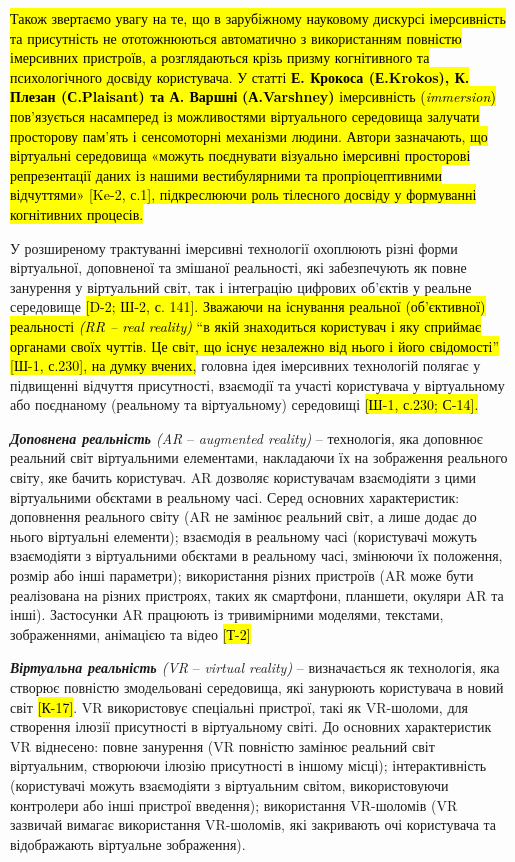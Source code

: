 \hl{Також звертаємо увагу на те, що в зарубіжному науковому дискурсі імерсивність та присутність не ототожнюються автоматично з використанням повністю імерсивних пристроїв, а розглядаються крізь призму когнітивного та психологічного досвіду користувача. У статті \textbf{Е. Крокоса (Е.Krokos), К. Плезан (С.Plaisant) та А. Варшні} \textbf{(А.Varshney)} імерсивність (\emph{immersion}) пов'язується насамперед із можливостями віртуального середовища залучати просторову пам'ять і сенсомоторні механізми людини. Автори зазначають, що віртуальні середовища «можуть поєднувати візуально імерсивні просторові репрезентації даних із нашими вестибулярними та пропріоцептивними відчуттями» {[}Ke-2, с.1{]}, підкреслюючи роль тілесного досвіду у формуванні когнітивних процесів.}

У розширеному трактуванні імерсивні технології охоплюють різні форми віртуальної, доповненої та змішаної реальності, які забезпечують як повне занурення у віртуальний світ, так і інтеграцію цифрових об'єктів у реальне середовище \hl{{[}D-2; Ш-2, с. 141{]}. Зважаючи на існування реальної (об'єктивної) реальності \emph{(RR -- real reality)} ``в якій знаходиться користувач і яку сприймає органами своїх чуттів. Це світ, що існує незалежно від нього і його свідомості'' {[}Ш-1, с.230{]}, на думку вчених,} головна ідея імерсивних технологій полягає у підвищенні відчуття присутності, взаємодії та участі користувача у віртуальному або поєднаному (реальному та віртуальному) середовищі \hl{{[}Ш-1, с.230; С-14{]}.}

\emph{\textbf{Доповнена реальність} (AR} -- \emph{augmented reality)} -- технологія, яка доповнює реальний світ віртуальними елементами, накладаючи їх на зображення реального світу, яке бачить користувач. AR дозволяє користувачам взаємодіяти з цими віртуальними об\textquotesingle єктами в реальному часі. Серед основних характеристик: доповнення реального світу (AR не замінює реальний світ, а лише додає до нього віртуальні елементи); взаємодія в реальному часі (користувачі можуть взаємодіяти з віртуальними об\textquotesingle єктами в реальному часі, змінюючи їх положення, розмір або інші параметри); використання різних пристроїв (AR може бути реалізована на різних пристроях, таких як смартфони, планшети, окуляри AR та інші). Застосунки AR працюють із тривимірними моделями, текстами, зображеннями, анімацією та відео \hl{{[}Т-2{]}}

\emph{\textbf{Віртуальна реальність} (VR} -- \emph{virtual reality)} -- визначається як технологія, яка створює повністю змодельовані середовища, які занурюють користувача в новий світ \hl{{[}К-17{]}}. VR використовує спеціальні пристрої, такі як VR-шоломи, для створення ілюзії присутності в віртуальному світі. До основних характеристик VR віднесено: повне занурення (VR повністю замінює реальний світ віртуальним, створюючи ілюзію присутності в іншому місці); інтерактивність (користувачі можуть взаємодіяти з віртуальним світом, використовуючи контролери або інші пристрої введення); використання VR-шоломів (VR зазвичай вимагає використання VR-шоломів, які закривають очі користувача та відображають віртуальне зображення).


